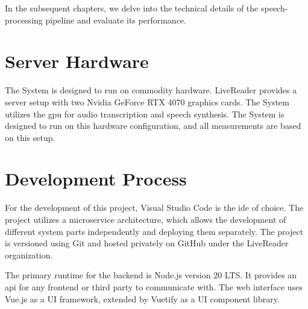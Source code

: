 In the subsequent chapters, we delve into the technical details of the speech-processing pipeline and evaluate its 
performance.


\section{Server Hardware}

The System is designed to run on commodity hardware. LiveReader provides a server setup with two Nvidia GeForce RTX 
4070 graphics cards. The System utilizes the \ac{gpu} for audio transcription and speech synthesis. The System is 
designed to run on this hardware configuration, and all measurements are based on this setup.


\section{Development Process}

For the development of this project, Visual Studio Code is the \ac{ide} of choice. The project utilizes a microservice 
architecture, which allows the development of different system parts independently and deploying them separately. 
The project is versioned using Git and hosted privately on GitHub under the LiveReader organization. 

The primary runtime for the backend is Node.js version 20 LTS. It provides an \ac{api} for any frontend or third party 
to communicate with. The web interface uses Vue.js as a UI framework, extended by Vuetify as a UI component library.
